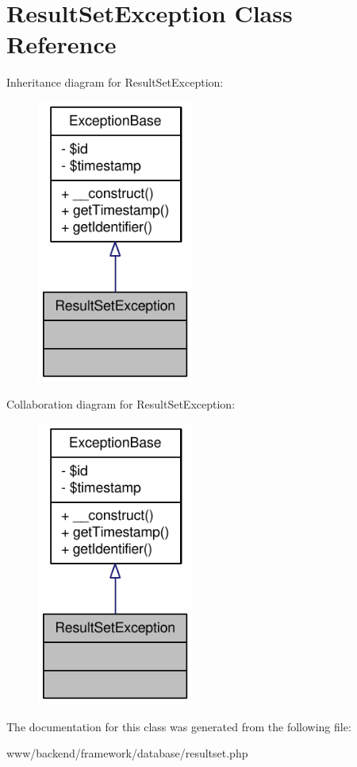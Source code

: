 \hypertarget{classResultSetException}{
\section{ResultSetException Class Reference}
\label{classResultSetException}
}


Inheritance diagram for ResultSetException:\nopagebreak
\begin{figure}[H]
\begin{center}
\leavevmode
\includegraphics[width=146pt]{classResultSetException__inherit__graph}
\end{center}
\end{figure}


Collaboration diagram for ResultSetException:\nopagebreak
\begin{figure}[H]
\begin{center}
\leavevmode
\includegraphics[width=146pt]{classResultSetException__coll__graph}
\end{center}
\end{figure}


The documentation for this class was generated from the following file:\begin{DoxyCompactItemize}
\item 
www/backend/framework/database/resultset.php\end{DoxyCompactItemize}
